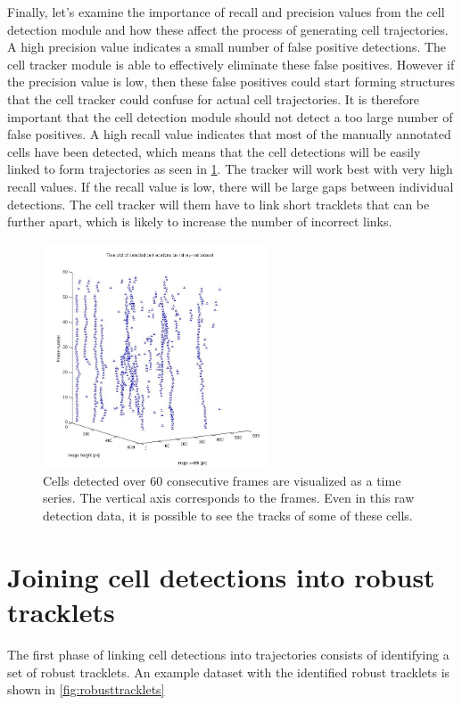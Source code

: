 		Finally, let's examine the importance of recall and precision values from the cell detection module and how these affect the process of generating cell trajectories. A high precision value indicates a small number of false positive detections. The cell tracker module is able to effectively eliminate these false positives. However if the precision value is low, then these false positives could start forming structures that the cell tracker could confuse for actual cell trajectories. It is therefore important that the cell detection module should not detect a too large number of false positives. A high recall value indicates that most of the manually annotated cells have been detected, which means that the cell detections will be easily linked to form trajectories as seen in \cref{fig:cell_tracks_detection}. The tracker will work best with very high recall values. If the recall value is low, there will be large gaps between individual detections. The cell tracker will them have to link short tracklets that can be further apart, which is likely to increase the number of incorrect links.
				
		\begin{figure}[h]
			\centering
			\includegraphics[width=0.6\textwidth]{images/cell_tracks}
				\caption{Cells detected over 60 consecutive frames are visualized as a time series. The vertical axis corresponds to the frames. Even in this raw detection data, it is possible to see the tracks of some of these cells.}
			\label{fig:cell_tracks_detection}
		\end{figure}
	
	\section{Joining cell detections into robust tracklets}
		\label{sec:tracking_robusttracklets}
		The first phase of linking cell detections into trajectories consists of identifying a set of robust tracklets. An example dataset with the identified robust tracklets is shown in \cref{fig:robusttracklets}
		
